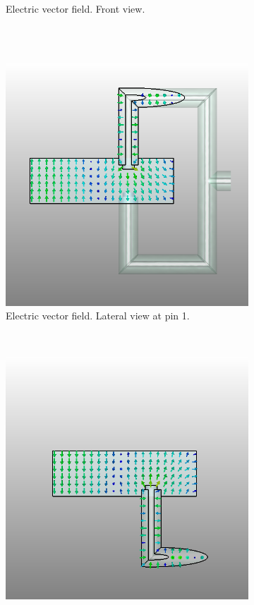 \documentclass[english,twoside]{article}
\begin{document}
\begin{landscape}
\begin{figure}
\begin{subfigure}[b]{0.4\textwidth}
					\caption{Electric vector field. Front view.}
				\end{subfigure}
				\vspace{10pt}\\
				~ %
				\begin{subfigure}[b]{0.4\textwidth}
					\includegraphics[width=\textwidth]{figures/coaxToWrTE20_lateral1}
					\caption{Electric vector field. Lateral view at pin 1.}
				\end{subfigure}
				~
				\begin{subfigure}[b]{0.4\textwidth}
					\includegraphics[width=\textwidth]{figures/coaxToWrTE20_lateral2}

\end{subfigure}
\end{figure}
\end{landscape}
\end{document}
